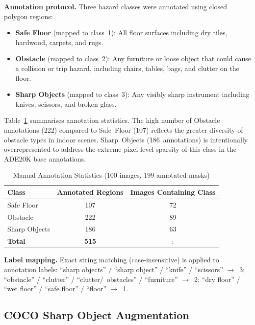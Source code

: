 \noindent\textbf{Annotation protocol.}
Three hazard classes were annotated using closed polygon regions:
\begin{itemize}
\item \textbf{Safe Floor} (mapped to class~1): All floor surfaces
including dry tiles, hardwood, carpets, and rugs.
\item \textbf{Obstacle} (mapped to class~2): Any furniture or loose
object that could cause a collision or trip hazard, including chairs,
tables, bags, and clutter on the floor.
\item \textbf{Sharp Objects} (mapped to class~3): Any visibly sharp
instrument including knives, scissors, and broken glass.
\end{itemize}

Table~\ref{tab:ann_stats} summarises annotation statistics.
The high number of Obstacle annotations (222) compared to Safe~Floor
(107) reflects the greater diversity of obstacle types in indoor
scenes. Sharp~Objects (186~annotations) is intentionally
overrepresented to address the extreme pixel-level sparsity of this
class in the ADE20K base annotations.

\begin{table}[h]
\centering
\caption{Manual Annotation Statistics (100 images, 199 annotated masks)}
\label{tab:ann_stats}
\begin{tabular}{lcc}
\toprule
\textbf{Class} & \textbf{Annotated Regions} & \textbf{Images Containing Class} \\
\midrule
Safe Floor & 107 & 72 \\
Obstacle & 222 & 89 \\
Sharp Objects & 186 & 63 \\
\midrule
\textbf{Total} & \textbf{515} &: \\
\bottomrule
\end{tabular}
\end{table}

\noindent\textbf{Label mapping.}
Exact string matching (case-insensitive) is applied to annotation
labels: ``sharp objects'' / ``sharp object'' / ``knife'' /
``scissors'' $\to$~3; ``obstacle'' / ``clutter'' /
``clutter/~obstacles'' / ``furniture'' $\to$~2;
``dry floor'' / ``wet floor'' / ``safe floor'' / ``floor'' $\to$~1.

\subsection{COCO Sharp Object Augmentation}

